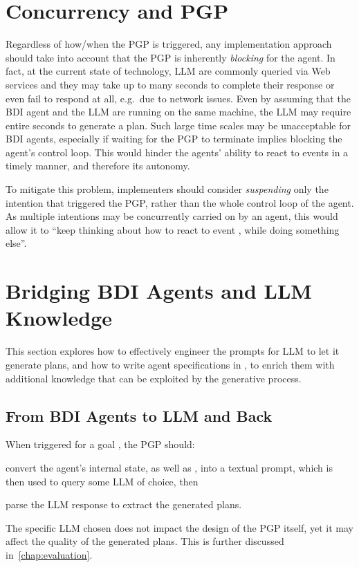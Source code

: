 \documentclass[12pt,a4paper,openright,twoside]{book}
\begin{document}
\section{Concurrency and PGP}\label{sec:concurrency-and-pgp}

Regardless of how/when the \ac{PGP} is triggered, any implementation approach should take into account that the \ac{PGP} is inherently \emph{blocking} for the agent.
%
In fact, at the current state of technology, \ac{LLM} are commonly queried via Web services and they may take up to many seconds to complete their response or even fail to respond at all, e.g.\ due to network issues.
%
Even by assuming that the \ac{BDI} agent and the \ac{LLM} are running on the same machine, the \ac{LLM} may require entire seconds to generate a plan.
%
Such large time scales may be unacceptable for \ac{BDI} agents, especially if waiting for the \ac{PGP} to terminate implies blocking the agent's control loop.
%
This would hinder the agents' ability to react to events in a timely manner, and therefore its autonomy.

To mitigate this problem, implementers should consider \emph{suspending} only the intention that triggered the \ac{PGP}, rather than the whole control loop of the agent.
%
As multiple intentions may be concurrently carried on by an \agentspeak{} agent, this would allow it to ``keep thinking about how to react to event , while doing something else''.

\section{Bridging BDI Agents and LLM Knowledge}\label{sec:transferring-knowledge}

This section explores how to effectively engineer the prompts for \ac{LLM} to let it generate plans, and how to write agent specifications in \agentspeak{}, to enrich them with additional knowledge that can be exploited by the generative process.

\subsection{From BDI Agents to LLM and Back}

When triggered for a goal , the \ac{PGP} should:
%
\begin{inlinelist}
    \item convert the agent's internal state, as well as , into a textual prompt, which is then used to query some \ac{LLM} of choice, then
    \item parse the \ac{LLM} response to extract the generated plans.
\end{inlinelist}
%
The specific \ac{LLM} chosen does not impact the design of the \ac{PGP} itself, yet it may affect the quality of the generated plans. This is further discussed in~\cref{chap:evaluation}.
\end{document}
